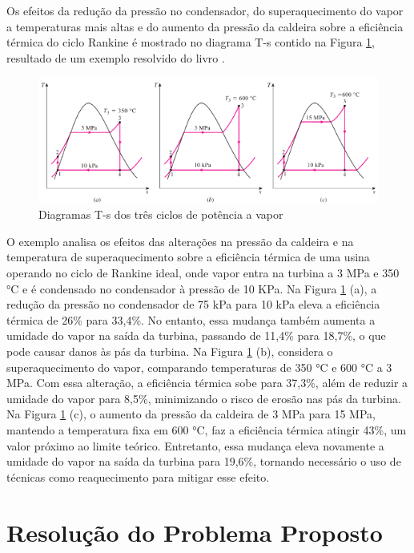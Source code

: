 \documentclass[
	article,			%
	11pt,				%
	oneside,			%
	a4paper,			%
	english,			%
	brazil,				%
	sumario=tradicional
	]{abntex2}
\begin{document}
Os efeitos da redução da pressão no condensador, do superaquecimento do vapor a temperaturas mais altas e do aumento da pressão da caldeira sobre a eficiência térmica do ciclo Rankine é mostrado no diagrama T-s contido na Figura \ref{fig:diagramas-ts-3-ciclos}, resultado de um exemplo resolvido do livro \cite{cengel-2008}.

\begin{figure}[h]
	\centering
	\includegraphics[width=1.0\textwidth]{./images/diagramas-ts-3-ciclos.png}
	\caption{Diagramas T-s dos três ciclos de potência a vapor}
	\label{fig:diagramas-ts-3-ciclos}
\end{figure}

O exemplo analisa os efeitos das alterações na pressão da caldeira e na temperatura de superaquecimento sobre a eficiência térmica de uma usina operando no ciclo de Rankine ideal, onde vapor entra na turbina a 3 MPa e 350 °C e é condensado no condensador à pressão de 10 KPa.
Na Figura \ref{fig:diagramas-ts-3-ciclos} (a), a redução da pressão no condensador de 75 kPa para 10 kPa eleva a eficiência térmica de 26\% para 33,4\%. No entanto, essa mudança também aumenta a umidade do vapor na saída da turbina, passando de 11,4\% para 18,7\%, o que pode causar danos às pás da turbina.
Na Figura \ref{fig:diagramas-ts-3-ciclos} (b), considera o superaquecimento do vapor, comparando temperaturas de 350 °C e 600 °C a 3 MPa. Com essa alteração, a eficiência térmica sobe para 37,3\%, além de reduzir a umidade do vapor para 8,5\%, minimizando o risco de erosão nas pás da turbina.
Na Figura \ref{fig:diagramas-ts-3-ciclos} (c), o aumento da pressão da caldeira de 3 MPa para 15 MPa, mantendo a temperatura fixa em 600 °C, faz a eficiência térmica atingir 43\%, um valor próximo ao limite teórico. Entretanto, essa mudança eleva novamente a umidade do vapor na saída da turbina para 19,6\%, tornando necessário o uso de técnicas como reaquecimento para mitigar esse efeito.

\section{Resolução do Problema Proposto}
\end{document}
